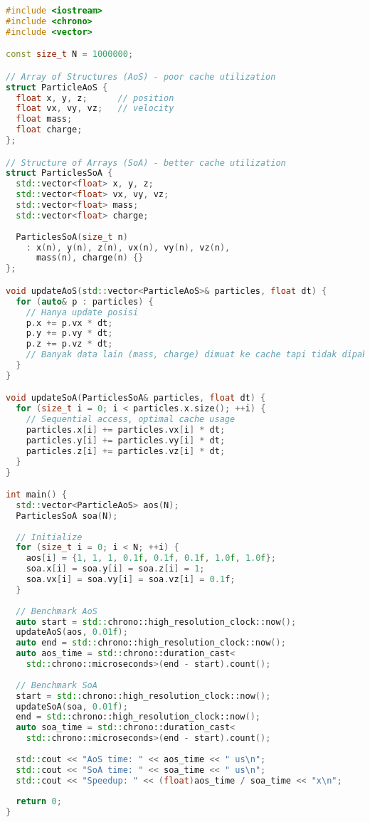 \documentclass[../main.tex]{subfiles}
\begin{document}
\begin{lstlisting}[language=C++, caption={AoS vs SoA comparison}]
#include <iostream>
#include <chrono>
#include <vector>

const size_t N = 1000000;

// Array of Structures (AoS) - poor cache utilization
struct ParticleAoS {
  float x, y, z;      // position
  float vx, vy, vz;   // velocity
  float mass;
  float charge;
};

// Structure of Arrays (SoA) - better cache utilization
struct ParticlesSoA {
  std::vector<float> x, y, z;
  std::vector<float> vx, vy, vz;
  std::vector<float> mass;
  std::vector<float> charge;
  
  ParticlesSoA(size_t n) 
    : x(n), y(n), z(n), vx(n), vy(n), vz(n), 
      mass(n), charge(n) {}
};

void updateAoS(std::vector<ParticleAoS>& particles, float dt) {
  for (auto& p : particles) {
    // Hanya update posisi
    p.x += p.vx * dt;
    p.y += p.vy * dt;
    p.z += p.vz * dt;
    // Banyak data lain (mass, charge) dimuat ke cache tapi tidak dipakai
  }
}

void updateSoA(ParticlesSoA& particles, float dt) {
  for (size_t i = 0; i < particles.x.size(); ++i) {
    // Sequential access, optimal cache usage
    particles.x[i] += particles.vx[i] * dt;
    particles.y[i] += particles.vy[i] * dt;
    particles.z[i] += particles.vz[i] * dt;
  }
}

int main() {
  std::vector<ParticleAoS> aos(N);
  ParticlesSoA soa(N);
  
  // Initialize
  for (size_t i = 0; i < N; ++i) {
    aos[i] = {1, 1, 1, 0.1f, 0.1f, 0.1f, 1.0f, 1.0f};
    soa.x[i] = soa.y[i] = soa.z[i] = 1;
    soa.vx[i] = soa.vy[i] = soa.vz[i] = 0.1f;
  }
  
  // Benchmark AoS
  auto start = std::chrono::high_resolution_clock::now();
  updateAoS(aos, 0.01f);
  auto end = std::chrono::high_resolution_clock::now();
  auto aos_time = std::chrono::duration_cast<
    std::chrono::microseconds>(end - start).count();
  
  // Benchmark SoA
  start = std::chrono::high_resolution_clock::now();
  updateSoA(soa, 0.01f);
  end = std::chrono::high_resolution_clock::now();
  auto soa_time = std::chrono::duration_cast<
    std::chrono::microseconds>(end - start).count();
  
  std::cout << "AoS time: " << aos_time << " us\n";
  std::cout << "SoA time: " << soa_time << " us\n";
  std::cout << "Speedup: " << (float)aos_time / soa_time << "x\n";
  
  return 0;
}
\end{lstlisting}
\end{document}
